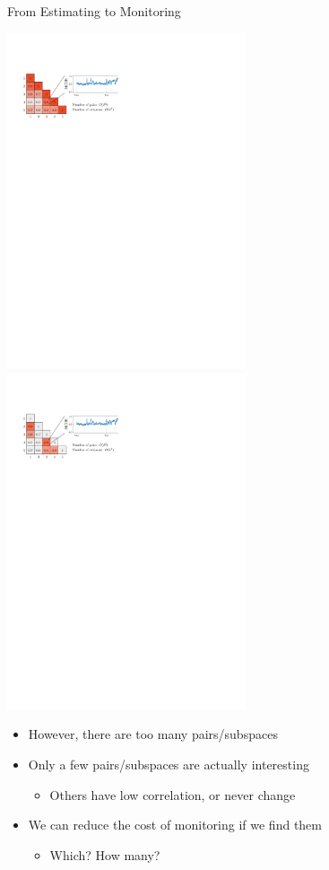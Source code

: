\documentclass[16pt,usenames,dvipsnames, notheorems]{beamer}
\theoremstyle{definition}
\theoremstyle{example}
\theoremstyle{plain}
\begin{document}
\begin{frame}{From Estimating to Monitoring}
\begin{overprint}
	 \includegraphics[width=7cm,scale=0.5]{figures/correlation_matrix_bis_3.pdf}
	\onslide<4-> \includegraphics[width=7cm,scale=0.5]{figures/correlation_matrix_bis_4.pdf}
\end{overprint}

\pause
\pause
\begin{itemize}
	\item However, there are too many pairs/subspaces 
	\pause
	\item Only a few pairs/subspaces are actually interesting
	\begin{itemize}
		\item Others have low correlation, or never change
	\end{itemize}  
	\pause
	\item We can reduce the cost of monitoring if we find them
	\begin{itemize}
		\item Which? How many? 
	\end{itemize} 
\end{itemize}

\end{frame}
\end{document}

